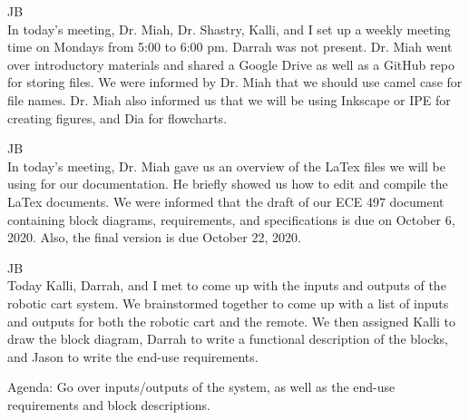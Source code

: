 \documentclass[fontsize=11pt, %
                             paper=letter, %
                             openany, %
                             captions=tableheading,
                             index=totoc,
                             hyperref]{labbook}
\begin{document}
\begin{addmargin}[0cm]{0cm} %

\pagestyle{scrheadings} %


JB\\
In today's meeting, Dr. Miah, Dr. Shastry, Kalli, and I set up a weekly meeting time on Mondays from 5:00 to 6:00 pm. Darrah was not present. Dr. Miah went over introductory materials and shared a Google Drive as well as a GitHub repo for storing files. We were informed by Dr. Miah that we should use camel case for file names. Dr. Miah also informed us that we will be using Inkscape or IPE for creating figures, and Dia for flowcharts. 


JB\\
In today's meeting, Dr. Miah gave us an overview of the LaTex files we will be using for our documentation. He briefly showed us how to edit and compile the LaTex documents. We were informed that the draft of our ECE 497 document containing block diagrams, requirements, and specifications is due on October 6, 2020. Also, the final version is due October 22, 2020.


JB\\
Today Kalli, Darrah, and I met to come up with the inputs and outputs of the robotic cart system. We brainstormed together to come up with a list of inputs and outputs for both the robotic cart and the remote. We then assigned Kalli to draw the block diagram, Darrah to write a functional description of the blocks, and Jason to write the end-use requirements.


Agenda: Go over inputs/outputs of the system, as well as the end-use requirements and block descriptions.

\vspace*{12pt}


\end{addmargin}
\end{document}
